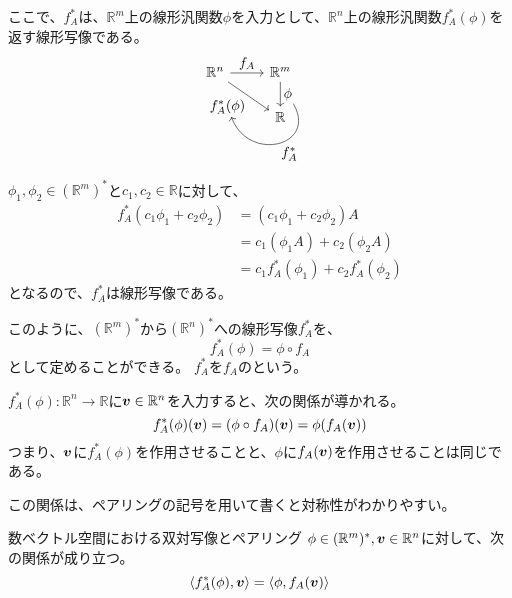 \documentclass[../../../topic_linear-algebra]{subfiles}
\begin{document}
ここで、$f_{A}^*$は、$\mathbb{R}^m$上の線形汎関数$\phi$を入力として、$\mathbb{R}^n$上の線形汎関数$f_A^*(\phi)$を返す線形写像である。
\begin{equation*}
  \begin{tikzcd}[every label/.append style = {font = \normalsize}]
    \mathbb{R}^n \arrow[r,"f_A"]\arrow[rd, "f_A^*(\phi)"'{name=v}] & \mathbb{R}^m \arrow[d,"\phi"{name=w}] \arrow[from=w,to=v,out=-60, in=-70,looseness=2,"f_A^*"]\\
    & \mathbb{R}
  \end{tikzcd}
\end{equation*}

\begin{handout}[補足：$f_A^*$の線形性]
  $\phi_1, \phi_2 \in (\mathbb{R}^m)^*$と$c_1, c_2 \in \mathbb{R}$に対して、
  \begin{align*}
    f_A^*(c_1 \phi_1 + c_2 \phi_2) &= (c_1 \phi_1 + c_2 \phi_2) A \\
    &= c_1 (\phi_1 A) + c_2 (\phi_2 A) \\
    &= c_1 f_A^*(\phi_1) + c_2 f_A^*(\phi_2)
  \end{align*}
  となるので、$f_A^*$は線形写像である。
\end{handout}

このように、$(\mathbb{R}^m)^*$から$(\mathbb{R}^n)^*$への線形写像$f_A^*$を、
\begin{equation*}
  f_A^*(\phi) = \phi \circ f_A
\end{equation*}
として定めることができる。
$f_A^*$を$f_A$のという。

\br

$f_A^*(\phi)\colon \mathbb{R}^n \to \mathbb{R}$に$\vb*{v} \in \mathbb{R}^n$を入力すると、次の関係が導かれる。
\begin{equation*}
  f_A^*(\phi)(\vb*{v}) = (\phi \circ f_A)(\vb*{v}) = \phi(f_A(\vb*{v}))
\end{equation*}
つまり、$\vb*{v}$に$f_A^*(\phi)$を作用させることと、$\phi$に$f_A(\vb*{v})$を作用させることは同じである。

\br

この関係は、ペアリングの記号を用いて書くと対称性がわかりやすい。

\begin{theorem}{数ベクトル空間における双対写像とペアリング}
  $\phi \in (\mathbb{R}^m)^*, \vb*{v} \in \mathbb{R}^n$に対して、次の関係が成り立つ。
  \begin{equation*}
    \langle f_A^*(\phi), \vb*{v} \rangle = \langle \phi, f_A(\vb*{v}) \rangle
  \end{equation*}
\end{theorem}
\end{document}
